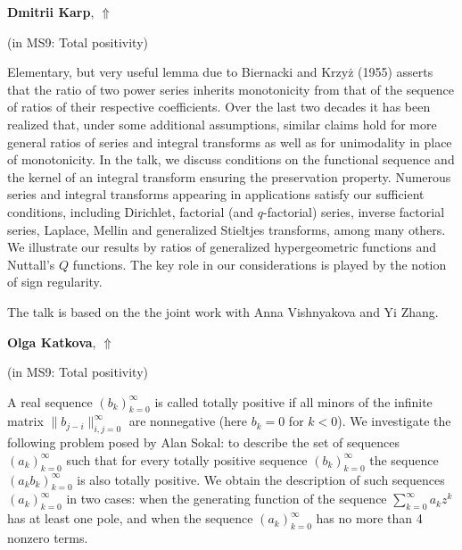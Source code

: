 \documentclass[ILAS2025-program.tex]{subfiles}
\begin{document}
\hypertarget{down0044}{}\begin{ilasabstract}
    
\textbf{Dmitrii Karp},  \hfill \hyperlink{up0044}{$\Uparrow$}
    
    
(in {\color{mstitle}MS9: Total positivity})
        
\mtskip
    Elementary, but very useful lemma due to Biernacki and Krzy\.{z} (1955) asserts that the ratio of two power series inherits monotonicity from that of the sequence of ratios of their respective  coefficients. Over the last two decades it has been realized that, under some additional assumptions, similar claims hold for more general ratios of series and integral
transforms as well as for unimodality in place of monotonicity. In the talk, we discuss conditions on the functional sequence and the kernel of an integral transform ensuring the preservation property. Numerous series and integral transforms appearing in applications satisfy our sufficient conditions, including Dirichlet, factorial (and $q$-factorial) series, inverse factorial series, Laplace, Mellin and generalized Stieltjes transforms, among many others.  We illustrate our results by ratios of generalized hypergeometric functions and Nuttall's $Q$ functions.  The key role in our considerations is played by the notion of sign regularity.

The talk is based on the the joint work with Anna Vishnyakova and Yi Zhang. 

\end{ilasabstract}
    

\hypertarget{down0120}{}\begin{ilasabstract}
    
\textbf{Olga Katkova},  \hfill \hyperlink{up0120}{$\Uparrow$}
    
    
(in {\color{mstitle}MS9: Total positivity})
        
\mtskip
    A real sequence $(b_k)_{k=0}^\infty$ is called totally positive if all minors of the infinite matrix $\| b_{j-i} \|_{i,j=0}^\infty$ are
nonnegative (here $b_k = 0$ for $k<0$). We investigate the following problem posed by Alan Sokal: to describe the set of sequences $(a_k)_{k=0}^\infty$ such that for every totally positive sequence $(b_k)_{k=0}^\infty$ the sequence $(a_k b_k)_{k=0}^\infty$ is also totally positive. We obtain the description of such sequences $(a_k)_{k=0}^\infty$ in two cases: when the generating function of the sequence $\sum_{k=0}^\infty a_k z^k$ has at least one pole, and when the sequence $(a_k)_{k=0}^\infty$ has no more than 4 nonzero terms.
\end{ilasabstract}
    
\end{document}
